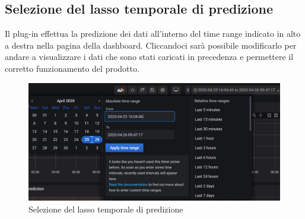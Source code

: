     \subsection{Selezione del lasso temporale di predizione}
        Il plug-in effettua la predizione dei dati all'interno del time range indicato in alto a destra nella pagina della dashboard\glo. Cliccandoci sarà possibile modificarlo per andare a visualizzare i dati che sono stati caricati in precedenza e permettere il corretto funzionamento del prodotto\glo.
        \begin{figure}[H]
            \includegraphics[width=\textwidth,height=\textheight,keepaspectratio]{img/time_range.png}
            \caption{Selezione del lasso temporale di predizione}
        \end{figure}